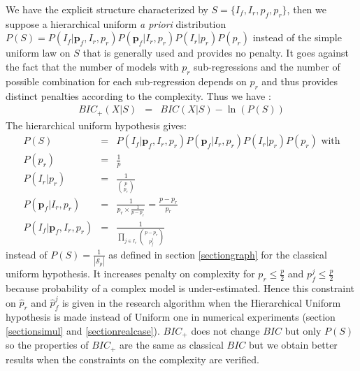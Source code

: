 \documentclass[12pt,a4paper]{report}
\begin{document}
We have the explicit structure characterized by $S=\{I_f,I_r,p_f,p_r\}$, then we suppose a hierarchical uniform {\it a priori} distribution $P(S)=P(I_f | \boldsymbol{p}_f,I_r,p_r)P(\boldsymbol{p}_f|I_r,p_r)P(I_r|p_r)P(p_r)$  instead of the simple uniform law on $S$ that is generally used and provides no penalty.
It goes against the fact that the number of models with $p_r$ sub-regressions and the number of possible combination for each sub-regression depends on $p_r$ and thus provides distinct penalties according to the complexity. 
	 Thus we have :
		\begin{eqnarray}
		BIC_+(X|S)&=&BIC(X|S) -\ln(P(S)) \label{Bicstar}
	\end{eqnarray}		
	The hierarchical uniform hypothesis gives:
	\begin{eqnarray}
	P(S)&=&P(I_f | \boldsymbol{p}_f,I_r,p_r)P(\boldsymbol{p}_f|I_r,p_r)P(I_r|p_r)P(p_r) \textrm{ with} \\
	P(p_r)&=&\frac{1}{p} \\
	P(I_r|p_r)&=& \frac{1}{ { p \choose p_r} }\\
	P(\boldsymbol{p}_f|I_r,p_r)&=& \frac{1}{p_r \times \frac{1}{p-p_r}}=\frac{p-p_r}{p_r}\\
	P(I_f | \boldsymbol{p}_f,I_r,p_r)&=&\frac{1}{\prod_{j \in I_r}{ p-p_r \choose p_f^j }}  
	\end{eqnarray}
	instead of $P(S)=\frac{1}{|\mathcal{S}_p|}$ as defined in section \ref{sectiongraph} for the classical uniform hypothesis.
	It increases penalty on complexity for $p_r\leq\frac{p}{2}$ and $p_f^j\leq\frac{p}{2}$ because probability of a complex model is under-estimated. Hence %
	this constraint on $\hat{p}_r$ and $\hat{p}_f^j$ is given in the research algorithm when the Hierarchical Uniform hypothesis is made instead of Uniform one in numerical experiments (section \ref{sectionsimul} and \ref{sectionrealcase}).
		$BIC_+$ does not change $BIC$ but only $P(S)$ so the properties of $BIC_+$ are the same as classical $BIC$ but we obtain better results when the constraints on the complexity are verified.  %


%	 
%	
\end{document}
